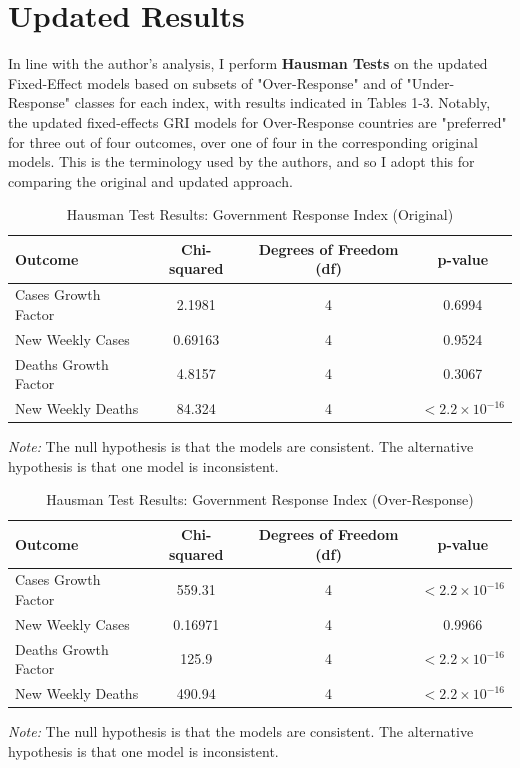 \documentclass[12pt,letterpaper]{article}
\begin{document}
	
	\section*{Updated Results}
	
	\vspace{.25cm}	
	
	\noindent In line with the author's analysis, I perform \textbf{Hausman Tests} on the updated Fixed-Effect models based on subsets of "Over-Response" and of "Under-Response" classes for each index, with results indicated in Tables 1-3. Notably, the updated fixed-effects GRI models for Over-Response countries are "preferred" for three out of four outcomes, over one of four in the corresponding original models. This is the terminology used by the authors, and so I adopt this for comparing the original and updated approach.
	
	\begin{table}[ht]
		\centering
		\caption{Hausman Test Results: Government Response Index (Original)}
		\label{tab:hausman_test1}
		\begin{tabular}{lccc}
			\hline
			\textbf{Outcome} & \textbf{Chi-squared} & \textbf{Degrees of Freedom (df)} & \textbf{p-value} \\
			\hline
			Cases Growth Factor & 2.1981 & 4 & 0.6994 \\
			New Weekly Cases & 0.69163 & 4 & 0.9524 \\
			Deaths Growth Factor & 4.8157 & 4 & 0.3067 \\
			New Weekly Deaths & 84.324 & 4 & $< 2.2 \times 10^{-16}$ \\
			\hline
		\end{tabular}
		\begin{flushleft}
			\emph{Note:} The null hypothesis is that the models are consistent. The alternative hypothesis is that one model is inconsistent.
		\end{flushleft}
	\end{table}
	
	\begin{table}[ht]
		\centering
		\caption{Hausman Test Results: Government Response Index (Over-Response)}
		\label{tab:hausman_test2}
		\begin{tabular}{lccc}
			\hline
			\textbf{Outcome} & \textbf{Chi-squared} & \textbf{Degrees of Freedom (df)} & \textbf{p-value} \\
			\hline
			Cases Growth Factor & 559.31 & 4 & $< 2.2 \times 10^{-16}$ \\
			New Weekly Cases & 0.16971 & 4 & 0.9966 \\
			Deaths Growth Factor & 125.9 & 4 & $< 2.2 \times 10^{-16}$ \\
			New Weekly Deaths & 490.94 & 4 & $< 2.2 \times 10^{-16}$ \\
			\hline
		\end{tabular}
		\begin{flushleft}
			\emph{Note:} The null hypothesis is that the models are consistent. The alternative hypothesis is that one model is inconsistent.
		\end{flushleft}
	\end{table}
	
\end{document}
